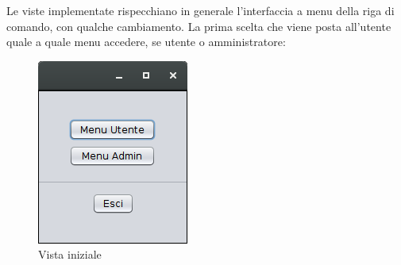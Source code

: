 \clearpage
Le viste implementate rispecchiano in generale l'interfaccia a menu della riga di comando, con qualche cambiamento. La prima scelta che viene posta all'utente quale a quale menu accedere, se utente o amministratore:

\begin{figure}[!htbp]
	\centering
	\includegraphics[width=.3\textwidth]{images/gui/menu_gui}
	\caption{Vista iniziale}
\end{figure}

